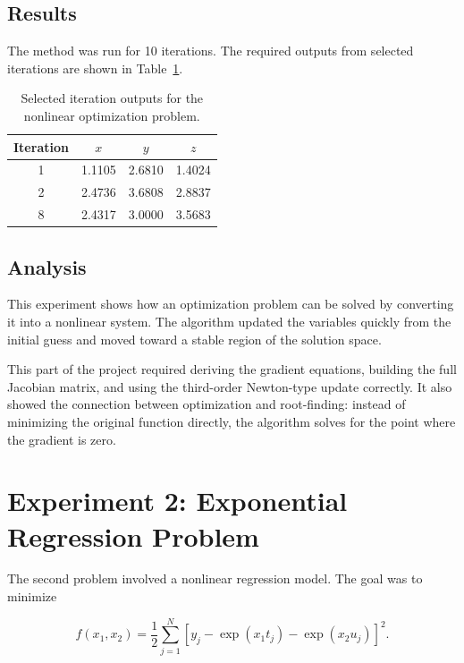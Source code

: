 \documentclass[11pt]{article}
\begin{document}
\subsection{Results}

The method was run for 10 iterations. The required outputs from selected iterations are shown in Table~\ref{tab:task1-results}.

\begin{table}[h!]
\centering
\begin{tabular}{cccc}
\toprule
\textbf{Iteration} & \textbf{$x$} & \textbf{$y$} & \textbf{$z$} \\
\midrule
1 & 1.1105 & 2.6810 & 1.4024 \\
2 & 2.4736 & 3.6808 & 2.8837 \\
8 & 2.4317 & 3.0000 & 3.5683 \\
\bottomrule
\end{tabular}
\caption{Selected iteration outputs for the nonlinear optimization problem.}
\label{tab:task1-results}
\end{table}

\subsection{Analysis}

This experiment shows how an optimization problem can be solved by converting it into a nonlinear system. The algorithm updated the variables quickly from the initial guess and moved toward a stable region of the solution space.

This part of the project required deriving the gradient equations, building the full Jacobian matrix, and using the third-order Newton-type update correctly. It also showed the connection between optimization and root-finding: instead of minimizing the original function directly, the algorithm solves for the point where the gradient is zero.

\section{Experiment 2: Exponential Regression Problem}

The second problem involved a nonlinear regression model. The goal was to minimize

\begin{equation}
    f(x_1,x_2) = \frac{1}{2}\sum_{j=1}^{N}\left[y_j - \exp(x_1t_j) - \exp(x_2u_j)\right]^2.
\end{equation}
\end{document}
